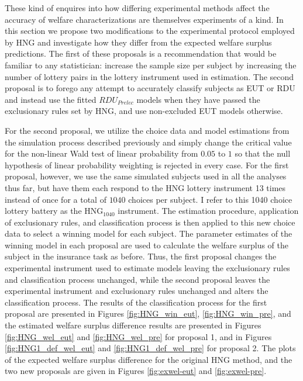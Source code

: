 \documentclass[../main.tex]{subfiles}
\begin{document}
\addtocounter{footnote}{-1}

These kind of enquires into how differing experimental methods affect the accuracy of welfare characterizations are themselves experiments of a kind.
In this section we propose two modifications to the experimental protocol employed by HNG and investigate how they differ from the expected welfare surplus predictions.
The first of these proposals is a recommendation that would be familiar to any statistician: increase the sample size per subject by increasing the number of lottery pairs in the lottery instrument used in estimation.
The second proposal is to forego any attempt to accurately classify subjects as EUT or RDU and instead use the fitted $\mathit{RDU_{Prelec}}$ models when they have passed the exclusionary rules set by HNG, and use non-excluded EUT models otherwise.

For the second proposal, we utilize the choice data and model estimations from the simulation process described previously and simply change the critical value for the non-linear Wald test of linear probability from $0.05$ to $1$ so that the null hypothesis of linear probability weighting is rejected in every case.
For the first proposal, however, we use the same simulated subjects used in all the analyses thus far, but have them each respond to the HNG lottery instrument 13 times instead of once for a total of $1040$ choices per subject.
I refer to this 1040 choice lottery battery as the $\text{HNG}_{1040}$ instrument.
The estimation procedure, application of exclusionary rules, and classification process is then applied to this new choice data to select a winning model for each subject.
The parameter estimates of the winning model in each proposal are used to calculate the welfare surplus of the subject in the insurance task as before.
Thus, the first proposal changes the experimental instrument used to estimate models leaving the exclusionary rules and classification process unchanged, while the second proposal leaves the experimental instrument and exclusionary rules unchanged and alters the classification process.
The results of the classification process for the first proposal are presented in Figures \ref{fig:HNG_win_eut}, \ref{fig:HNG_win_pre}, and the estimated welfare surplus difference results are presented in Figures \ref{fig:HNG_wel_eut} and \ref{fig:HNG_wel_pre} for proposal 1, and in Figures \ref{fig:HNG1_def_wel_eut} and \ref{fig:HNG1_def_wel_pre} for proposal 2.
The plots of the expected welfare surplus difference for the original HNG method, and the two new proposals are given in Figures \ref{fig:exwel-eut} and \ref{fig:exwel-pre}.
\end{document}
